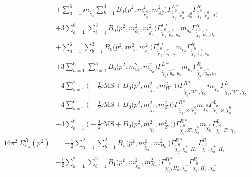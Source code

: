 \begin{itemize}
\begin{align}
 &+\sum_{a=1}^{6}m_{\tilde{\chi}^0_{{a}}} \sum_{b=1}^{3}{B_0\Big(p^{2},m^2_{\tilde{\chi}^0_{{a}}},m^2_{A^0_{{b}}}\Big)} {\Gamma^{L*}_{\check{\tilde{\chi}}^0_{{j}},\tilde{\chi}^0_{{a}},A^0_{{b}}}} {\Gamma^R_{\check{\tilde{\chi}}^0_{{i}},\tilde{\chi}^0_{{a}},A^0_{{b}}}}  \nonumber \\ 
 &+3 \sum_{a=1}^{6}\sum_{b=1}^{3}{B_0\Big(p^{2},m^2_{d_{{b}}},m^2_{\tilde{d}_{{a}}}\Big)} {\Gamma^{L*}_{\check{\tilde{\chi}}^0_{{j}},\tilde{d}^*_{{a}},d_{{b}}}} m_{d_{{b}}} {\Gamma^R_{\check{\tilde{\chi}}^0_{{i}},\tilde{d}^*_{{a}},d_{{b}}}}  \nonumber \\ 
 &+\sum_{a=1}^{6}\sum_{b=1}^{3}{B_0\Big(p^{2},m^2_{e_{{b}}},m^2_{\tilde{e}_{{a}}}\Big)} {\Gamma^{L*}_{\check{\tilde{\chi}}^0_{{j}},\tilde{e}^*_{{a}},e_{{b}}}} m_{e_{{b}}} {\Gamma^R_{\check{\tilde{\chi}}^0_{{i}},\tilde{e}^*_{{a}},e_{{b}}}} \nonumber \\ 
 &+3 \sum_{a=1}^{6}\sum_{b=1}^{3}{B_0\Big(p^{2},m^2_{u_{{b}}},m^2_{\tilde{u}_{{a}}}\Big)} {\Gamma^{L*}_{\check{\tilde{\chi}}^0_{{j}},\tilde{u}^*_{{a}},u_{{b}}}} m_{u_{{b}}} {\Gamma^R_{\check{\tilde{\chi}}^0_{{i}},\tilde{u}^*_{{a}},u_{{b}}}}  \nonumber \\ 
 &-4 \sum_{b=1}^{2}\Big(-\frac{1}{2} \text{rMS}  + {B_0\Big(p^{2},m^2_{\tilde{\chi}^-_{{b}}},m^2_{W^-}\Big)}\Big){\Gamma^{R*}_{\check{\tilde{\chi}}^0_{{j}},W^+,\tilde{\chi}^-_{{b}}}} m_{\tilde{\chi}^-_{{b}}} {\Gamma^L_{\check{\tilde{\chi}}^0_{{i}},W^+,\tilde{\chi}^-_{{b}}}}  \nonumber \\ 
 &-4 \sum_{b=1}^{6}\Big(-\frac{1}{2} \text{rMS}  + {B_0\Big(p^{2},m^2_{\tilde{\chi}^0_{{b}}},m^2_{Z}\Big)}\Big){\Gamma^{R*}_{\check{\tilde{\chi}}^0_{{j}},Z,\tilde{\chi}^0_{{b}}}} m_{\tilde{\chi}^0_{{b}}} {\Gamma^L_{\check{\tilde{\chi}}^0_{{i}},Z,\tilde{\chi}^0_{{b}}}}  \nonumber \\ 
 &-4 \sum_{b=1}^{6}\Big(-\frac{1}{2} \text{rMS}  + {B_0\Big(p^{2},m^2_{\tilde{\chi}^0_{{b}}},m^2_{{Z'}}\Big)}\Big){\Gamma^{R*}_{\check{\tilde{\chi}}^0_{{j}},{Z'},\tilde{\chi}^0_{{b}}}} m_{\tilde{\chi}^0_{{b}}} {\Gamma^L_{\check{\tilde{\chi}}^0_{{i}},{Z'},\tilde{\chi}^0_{{b}}}}  \\ 
16\pi^2 \ \Sigma^R_{i,j}(p^2) &= -\frac{1}{2} \sum_{a=1}^{2}\sum_{b=1}^{2}{B_1\Big(p^{2},m^2_{\tilde{\chi}^-_{{a}}},m^2_{H^-_{{b}}}\Big)} {\Gamma^{R*}_{\check{\tilde{\chi}}^0_{{j}},\tilde{\chi}^+_{{a}},H^-_{{b}}}} {\Gamma^R_{\check{\tilde{\chi}}^0_{{i}},\tilde{\chi}^+_{{a}},H^-_{{b}}}}  \nonumber \\ 
 &-\frac{1}{2} \sum_{a=1}^{2}\sum_{b=1}^{2}{B_1\Big(p^{2},m^2_{\tilde{\chi}^-_{{b}}},m^2_{H^-_{{a}}}\Big)} {\Gamma^{R*}_{\check{\tilde{\chi}}^0_{{j}},H^+_{{a}},\tilde{\chi}^-_{{b}}}} {\Gamma^R_{\check{\tilde{\chi}}^0_{{i}},H^+_{{a}},\tilde{\chi}^-_{{b}}}}  \nonumber \\ 

\end{align}
\end{itemize}
